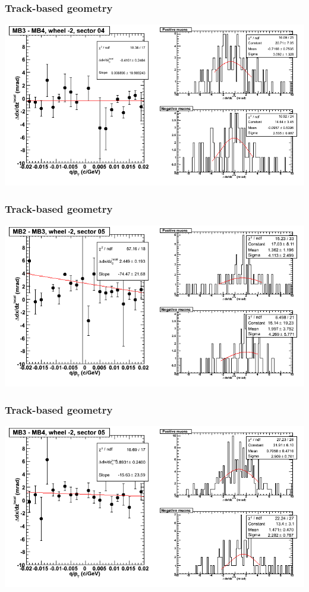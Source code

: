 \documentclass[compress]{beamer}
\begin{document}
\begin{frame}
\frametitle{Track-based geometry}
\includegraphics[width=\linewidth]{NOV4_segdiffs/dt13_slope_A_04_34.png}
\end{frame}

\begin{frame}
\frametitle{Track-based geometry}
\includegraphics[width=\linewidth]{NOV4_segdiffs/dt13_slope_A_05_23.png}
\end{frame}

\begin{frame}
\frametitle{Track-based geometry}
\includegraphics[width=\linewidth]{NOV4_segdiffs/dt13_slope_A_05_34.png}
\end{frame}
\end{document}
